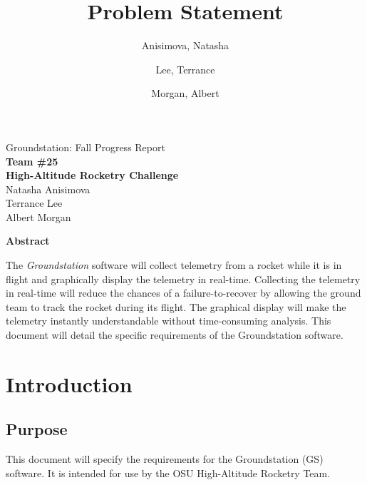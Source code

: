 \documentclass[10pt,draftclsnofoot,onecolumn]{IEEEtran}
\begin{document}
	\singlespace
	
	\title{\vspace{2in}Problem Statement}
	
	\author {
		Anisimova, Natasha
		\and
		Lee, Terrance
		\and
		Morgan, Albert
	}
	
	
	\pagestyle{empty}
	\vspace*{2in}
	\begin{center}
		\huge
		Groundstation: Fall Progress Report \\
		\normalsize
		\vspace{5mm}
		\textbf{
			Team \#25\\
			High-Altitude Rocketry Challenge\\
		}
		\vspace{1mm}
		Natasha Anisimova\\
		Terrance Lee\\
		Albert Morgan
	\end{center}
	
	\vspace{5mm}
	
	\begin{center}
		\textbf{Abstract}
	\end{center}
	
	
	The \textit{Groundstation} software will collect telemetry from a rocket while it is in flight and graphically display the telemetry in real-time.
	Collecting the telemetry in real-time will reduce the chances of a failure-to-recover by allowing the ground team to track the rocket during its flight.
	The graphical display will make the telemetry instantly understandable without time-consuming analysis.
	This document will detail the specific requirements of the Groundstation software.

	
	
	\newpage
	
	\tableofcontents
	\newpage
	
	\pagestyle{headings}


	\section{Introduction}
	
	\subsection{Purpose}
	This document will specify the requirements for the Groundstation (GS) software.
	It is intended for use by the OSU High-Altitude Rocketry Team.
	
\end{document}
